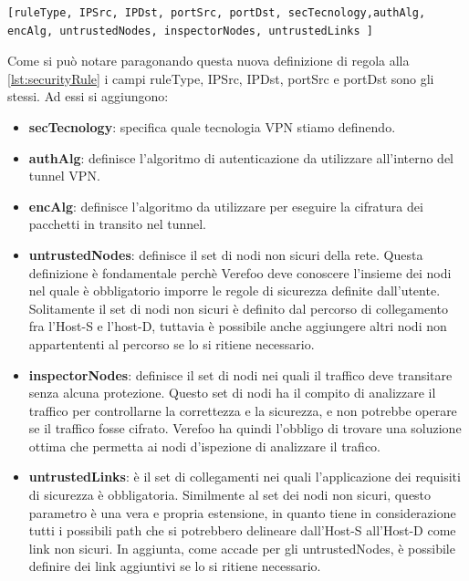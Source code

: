   \begin{lstlisting}[caption={Definizione di una proprietà di protezione},float={h}]
    [ruleType, IPSrc, IPDst, portSrc, portDst, secTecnology,authAlg, encAlg, untrustedNodes, inspectorNodes, untrustedLinks ]
\end{lstlisting}

Come si può notare paragonando questa nuova definizione di regola alla \ref{lst:securityRule} i campi ruleType, IPSrc, IPDst, portSrc e portDst sono gli stessi. Ad essi si aggiungono:

\begin{itemize}
    \item \textbf{secTecnology}: specifica quale tecnologia VPN stiamo definendo.
    \item \textbf{authAlg}: definisce l'algoritmo di autenticazione da utilizzare all'interno del tunnel VPN. 
    \item \textbf{encAlg}: definisce l'algoritmo da utilizzare per eseguire la cifratura dei pacchetti in transito nel tunnel.
    \item \textbf{untrustedNodes}: definisce il set di nodi non sicuri della rete. Questa definizione è fondamentale perchè Verefoo deve conoscere l'insieme dei nodi nel quale è obbligatorio imporre le regole di sicurezza definite dall'utente.
        Solitamente il set di nodi non sicuri è definito dal percorso di collegamento fra l'Host-S e l'host-D, tuttavia è possibile anche aggiungere altri nodi non appartententi al percorso se lo si ritiene necessario.
    \item \textbf{inspectorNodes}: definisce il set di nodi nei quali il traffico deve transitare senza alcuna protezione. Questo set di nodi ha il compito di analizzare il traffico per controllarne la correttezza e la sicurezza, e non potrebbe operare
        se il traffico fosse cifrato. Verefoo ha quindi l'obbligo di trovare una soluzione ottima che permetta ai nodi d'ispezione di analizzare il trafico. 
    \item \textbf{untrustedLinks}: è il set di collegamenti nei quali l'applicazione dei requisiti di sicurezza è obbligatoria.  Similmente al set dei nodi non sicuri, questo parametro è una vera e propria estensione, in quanto tiene in considerazione
        tutti i possibili path che si potrebbero delineare dall'Host-S all'Host-D come link non sicuri. In aggiunta, come accade per gli untrustedNodes, è possibile definire dei link aggiuntivi se lo si ritiene necessario.
\end{itemize}


